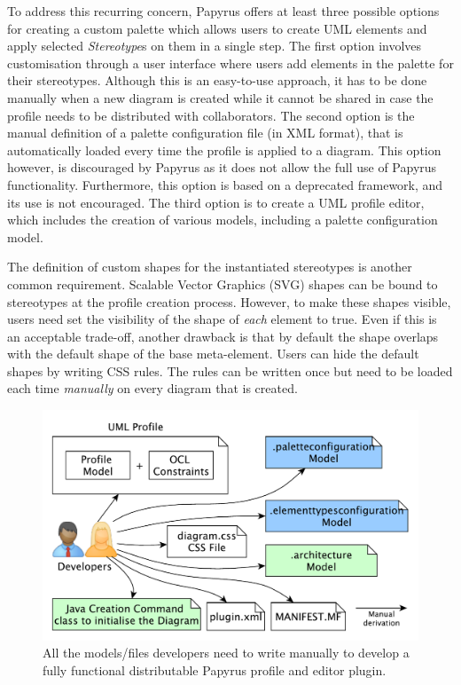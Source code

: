 To address this recurring concern, Papyrus offers at least three possible options for creating a custom palette which allows users to create  UML elements and apply selected \textit{Stereotype}s on them in a single step. 
The first option involves customisation through a user interface where users add elements in the palette for their stereotypes. 
Although this is an easy-to-use approach, it has to be done manually when a new diagram is created while it cannot be shared in case the profile needs to be distributed with collaborators. 
The second option is the manual definition of a palette configuration file (in XML format), that is automatically loaded every time the profile is applied to a diagram. 
This option however, is discouraged by Papyrus as it does not allow the full use of Papyrus functionality.
Furthermore, this option is based on a deprecated framework, and its use is not encouraged.  
The third option is to create a UML profile editor, which includes the creation of various models, including a palette configuration model. 

The definition of custom shapes for the instantiated stereotypes is another common requirement. 
Scalable Vector Graphics (SVG) shapes can be bound to stereotypes at the profile creation process. 
However, to make these shapes visible, users need set the visibility of the shape of \textit{each} element to true. 
Even if this is an acceptable trade-off, another drawback is that by default the shape overlaps with the default shape of the base meta-element. 
Users can hide the default shapes by writing CSS rules. 
The rules can be written once but need to be loaded each time \textit{manually} on every diagram that is created. 

\begin{figure}[t]
	\centering
	\includegraphics[width=1\textwidth]{diagrams/neededPapyrusFiles_new.pdf}
	\vspace{-3mm}
	\caption[]{All the models/files developers need to write manually to 
	develop a fully functional distributable Papyrus profile and editor plugin.}
	\label{fig:neededPapyrusFiles}
	\vspace*{-3mm}
\end{figure}

